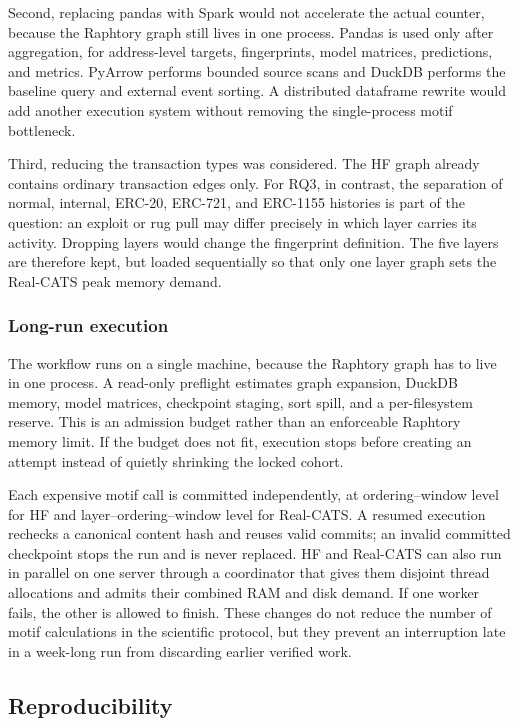 \documentclass{thesisclass}
\begin{document}
Second, replacing pandas with Spark would not accelerate the actual counter,
because the Raphtory graph still lives in one process. Pandas is used only after
aggregation, for address-level targets, fingerprints, model matrices,
predictions, and metrics. PyArrow performs bounded source scans and DuckDB
performs the baseline query and external event sorting. A distributed dataframe
rewrite would add another execution system without removing the single-process
motif bottleneck.

Third, reducing the transaction types was considered. The HF graph already
contains ordinary transaction edges only. For RQ3, in contrast, the separation
of normal, internal, ERC-20, ERC-721, and ERC-1155 histories is part of the
question: an exploit or rug pull may differ precisely in which layer carries its
activity. Dropping layers would change the fingerprint definition. The five
layers are therefore kept, but loaded sequentially so that only one layer graph
sets the Real-CATS peak memory demand.

\subsubsection{Long-run execution}

The workflow runs on a single machine, because the Raphtory graph has to live in
one process. A read-only preflight estimates graph expansion, DuckDB memory,
model matrices, checkpoint staging, sort spill, and a per-filesystem reserve.
This is an admission budget rather than an enforceable Raphtory memory limit. If
the budget does not fit, execution stops before creating an attempt instead of
quietly shrinking the locked cohort.

Each expensive motif call is committed independently, at ordering--window level
for HF and layer--ordering--window level for Real-CATS. A resumed execution
rechecks a canonical content hash and reuses valid commits; an invalid committed
checkpoint stops the run and is never replaced. HF and Real-CATS can also run in
parallel on one server through a coordinator that gives them disjoint thread
allocations and admits their combined RAM and disk demand. If one worker fails,
the other is allowed to finish. These changes do not reduce the number of motif
calculations in the scientific protocol, but they prevent an interruption late
in a week-long run from discarding earlier verified work.

\subsection{Reproducibility}
\end{document}
